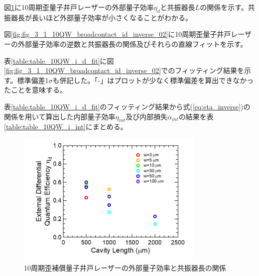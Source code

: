 {図\ref{fig:fig_3_1_10QW_broadcontact_id_02}に10周期歪量子井戸レーザーの外部量子効率$\eta_{d}$と共振器長$L$の関係を示す。共振器長が長いほど外部量子効率が小さくなることがわかる。

図\ref{fig:fig_3_1_10QW_broadcontact_id_inverse_02}に10周期歪量子井戸レーザーの外部量子効率の逆数と共振器長の関係及びそれらの直線フィットを示す。

表\ref{table:table_10QW_i_d_fit}に図\ref{fig:fig_3_1_10QW_broadcontact_id_inverse_02}でのフィッティング結果を示す。標準偏差1$\sigma$も併記した。「-」はプロットが少なく標準偏差を算出できなかったことを意味する。

表\ref{table:table_10QW_i_d_fit}のフィッティング結果から式(\ref{eq:eta_inverse})の関係を用いて算出した内部量子効率$\eta_{int}$及び内部損失$\alpha_{int}$の結果を表\ref{table:table_10QW_i_int}にまとめる。

\begin{figure}[h]
	\centering
	\includegraphics[width=9cm]{figure/fig_3_1_10QW_broadcontact_id_02.png}
	\caption{10周期歪補償量子井戸レーザーの外部量子効率と共振器長の関係}
	\label{fig:fig_3_1_10QW_broadcontact_id_02}
\end{figure}

}
